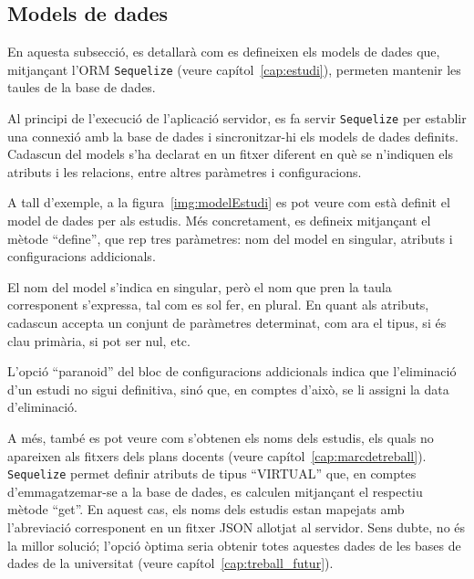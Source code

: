 \documentclass[a4paper,12pt]{ThesisStyle}
\begin{document}
\subsection{Models de dades}
\label{subsec:models_dades}

En aquesta subsecció, es detallarà com es defineixen els models de dades que, mitjançant l'ORM \texttt{Sequelize} (veure capítol~\ref{cap:estudi}), permeten mantenir les taules de la base de dades.

Al principi de l'execució de l'aplicació servidor, es fa servir \texttt{Sequelize} per establir una connexió amb la base de dades i sincronitzar-hi els models de dades definits. Cadascun del models s'ha declarat en un fitxer diferent en què se n'indiquen els atributs i les relacions, entre altres paràmetres i configuracions.

A tall d'exemple, a la figura~\ref{img:modelEstudi} es pot veure com està definit el model de dades per als estudis. Més concretament, es defineix mitjançant el mètode ``define'', que rep tres paràmetres: nom del model en singular, atributs i configuracions addicionals.

El nom del model s'indica en singular, però el nom que pren la taula corresponent s'expressa, tal com es sol fer, en plural. En quant als atributs, cadascun accepta un conjunt de paràmetres determinat, com ara el tipus, si és clau primària, si pot ser nul, etc.

L'opció ``paranoid'' del bloc de configuracions addicionals indica que l'eliminació d'un estudi no sigui definitiva, sinó que, en comptes d'això, se li assigni la data d'eliminació.

A més, també es pot veure com s'obtenen els noms dels estudis, els quals no apareixen als fitxers dels plans docents (veure capítol~\ref{cap:marcdetreball}). \texttt{Sequelize} permet definir atributs de tipus ``VIRTUAL'' que, en comptes d'emmagatzemar-se a la base de dades, es calculen mitjançant el respectiu mètode ``get''. En aquest cas, els noms dels estudis estan mapejats amb l'abreviació corresponent en un fitxer JSON allotjat al servidor. Sens dubte, no és la millor solució; l'opció òptima seria obtenir totes aquestes dades de les bases de dades de la universitat (veure capítol~\ref{cap:treball_futur}).
\end{document}

